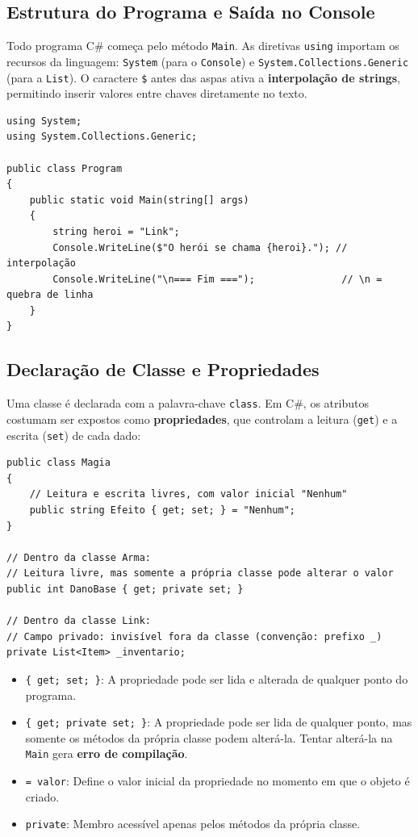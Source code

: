 \subsection{Estrutura do Programa e Saída no Console}

Todo programa C\# começa pelo método \texttt{Main}. As diretivas \texttt{using} importam os
recursos da linguagem: \texttt{System} (para o \texttt{Console}) e
\texttt{System.Collections.Generic} (para a \texttt{List}). O caractere \texttt{\$} antes das
aspas ativa a \textbf{interpolação de strings}, permitindo inserir valores entre chaves
diretamente no texto.

\begin{lstlisting}[style=csharp]
using System;
using System.Collections.Generic;

public class Program
{
    public static void Main(string[] args)
    {
        string heroi = "Link";
        Console.WriteLine($"O herói se chama {heroi}."); // interpolação
        Console.WriteLine("\n=== Fim ===");               // \n = quebra de linha
    }
}
\end{lstlisting}

\subsection{Declaração de Classe e Propriedades}

Uma classe é declarada com a palavra-chave \texttt{class}. Em C\#, os atributos costumam ser
expostos como \textbf{propriedades}, que controlam a leitura (\texttt{get}) e a escrita
(\texttt{set}) de cada dado:

\begin{lstlisting}[style=csharp]
public class Magia
{
    // Leitura e escrita livres, com valor inicial "Nenhum"
    public string Efeito { get; set; } = "Nenhum";
}

// Dentro da classe Arma:
// Leitura livre, mas somente a própria classe pode alterar o valor
public int DanoBase { get; private set; }

// Dentro da classe Link:
// Campo privado: invisível fora da classe (convenção: prefixo _)
private List<Item> _inventario;
\end{lstlisting}

\begin{itemize}
    \item \texttt{\{ get; set; \}}: A propriedade pode ser lida e alterada de qualquer ponto
    do programa.

    \item \texttt{\{ get; private set; \}}: A propriedade pode ser lida de qualquer ponto, mas
    somente os métodos da própria classe podem alterá-la. Tentar alterá-la na \texttt{Main}
    gera \textbf{erro de compilação}.

    \item \texttt{= valor}: Define o valor inicial da propriedade no momento em que o objeto
    é criado.

    \item \texttt{private}: Membro acessível apenas pelos métodos da própria classe.
\end{itemize}

